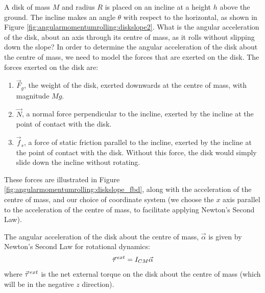 \begin{example}{A disk of mass $M$ and radius $R$ is placed on an incline at a height $h$ above the ground. The incline makes an angle $\theta$ with respect to the horizontal, as shown in Figure \ref{fig:angularmomentumrolling:diskslope2}. What is the angular acceleration of the disk, about an axis through its centre of mass, as it rolls without slipping down the slope?}
In order to determine the angular acceleration of the disk about the centre of mass, we need to model the forces that are exerted on the disk. The forces exerted on the disk are:
\begin{enumerate}
\item $\vec F_g$, the weight of the disk, exerted downwards at the centre of mass, with magnitude $Mg$.
\item $\vec N$, a normal force perpendicular to the incline, exerted by the incline at the point of contact with the disk.
\item $\vec f_s$, a force of static friction parallel to the incline, exerted by the incline at the point of contact with the disk. Without this force, the disk would simply slide down the incline without rotating. 
\end{enumerate}
These forces are illustrated in Figure \ref{fig:angularmomentumrolling:diskslope_fbd}, along with the acceleration of the centre of mass, and our choice of coordinate system (we choose the $x$ axis parallel to the acceleration of the centre of mass, to facilitate applying Newton's Second Law). 

The angular acceleration of the disk about the centre of mass, $\vec \alpha$ is given by Newton's Second Law for rotational dynamics:
\begin{align*}
\pvec\tau^{ext} = I_{CM}\vec\alpha
\end{align*}
where $\pvec\tau^{ext}$ is the net external torque on the disk about the centre of mass (which will be in the negative $z$ direction).


\end{example}
